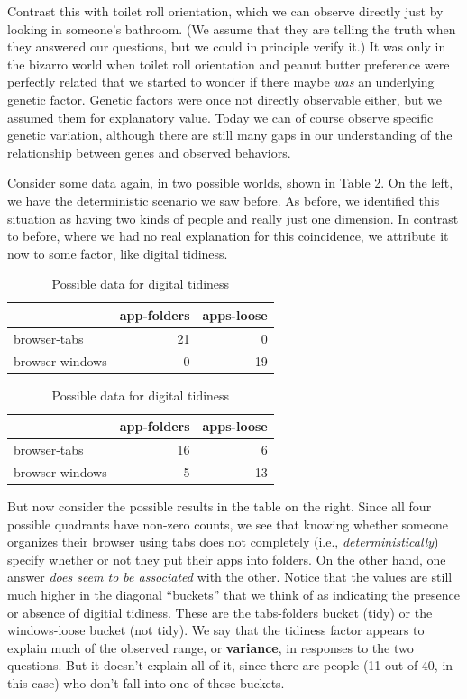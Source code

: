 \documentclass[
  openany]{book}
\begin{document}
Contrast this with toilet roll orientation, which we can observe directly just by looking in someone's bathroom. (We assume that they are telling the truth when they answered our questions, but we could in principle verify it.) It was only in the bizarro world when toilet roll orientation and peanut butter preference were perfectly related that we started to wonder if there maybe \emph{was} an underlying genetic factor. Genetic factors were once not directly observable either, but we assumed them for explanatory value. Today we can of course observe specific genetic variation, although there are still many gaps in our understanding of the relationship between genes and observed behaviors.

Consider some data again, in two possible worlds, shown in Table \ref{tab:tabsxapps}. On the left, we have the deterministic scenario we saw before. As before, we identified this situation as having two kinds of people and really just one dimension. In contrast to before, where we had no real explanation for this coincidence, we attribute it now to some factor, like digital tidiness.

\begin{table}[!h]
\caption{\label{tab:tabsxapps}Possible data for digital tidiness}

\centering
\begin{tabular}[t]{lrr}
\toprule
  & app-folders & apps-loose\\
\midrule
browser-tabs & 21 & 0\\
browser-windows & 0 & 19\\
\bottomrule
\end{tabular}
\centering
\begin{tabular}[t]{lrr}
\toprule
  & app-folders & apps-loose\\
\midrule
browser-tabs & 16 & 6\\
browser-windows & 5 & 13\\
\bottomrule
\end{tabular}
\end{table}

But now consider the possible results in the table on the right. Since all four possible quadrants have non-zero counts, we see that knowing whether someone organizes their browser using tabs does not completely (i.e., \emph{deterministically}) specify whether or not they put their apps into folders. On the other hand, one answer \emph{does seem to be associated} with the other. Notice that the values are still much higher in the diagonal ``buckets'' that we think of as indicating the presence or absence of digitial tidiness. These are the tabs-folders bucket (tidy) or the windows-loose bucket (not tidy). We say that the tidiness factor appears to explain much of the observed range, or \textbf{variance}, in responses to the two questions. But it doesn't explain all of it, since there are people (11 out of 40, in this case) who don't fall into one of these buckets.
\end{document}
